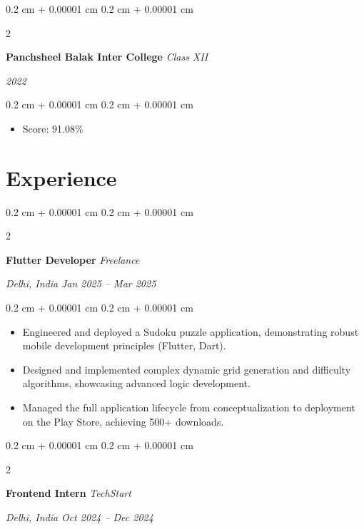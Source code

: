 \documentclass[10pt, a4paper]{article}
\newenvironment{highlights}{
    \begin{itemize}[
        topsep=0.10 cm,
        parsep=0.10 cm,
        partopsep=0pt,
        itemsep=0pt,
        leftmargin=0.4 cm + 10pt
    ]
}{
    \end{itemize}
} %
\newenvironment{onecolentry}{
    \begin{adjustwidth}{
        0.2 cm + 0.00001 cm
    }{
        0.2 cm + 0.00001 cm
    }
}{
    \end{adjustwidth}
} %
\newenvironment{twocolentry}[2][]{
    \onecolentry
    \def\secondColumn{#2}
    \setcolumnwidth{\fill, 4.5 cm}
    \begin{paracol}{2}
}{
    \switchcolumn \raggedleft \secondColumn
    \end{paracol}
    \endonecolentry
} %
\begin{document}
    \begin{twocolentry}{
        \textit{2022}
    }
    \textbf{Panchsheel Balak Inter College}
    \textit{Class XII}
    \end{twocolentry}
    \vspace{0.10 cm}
    \begin{onecolentry}
    \begin{highlights}
        \item Score: 91.08\%
    \end{highlights}
    \end{onecolentry}
    

    \section{Experience}

        \begin{twocolentry}{
            \textit{Delhi, India}    
            \textit{Jan 2025 -- Mar 2025}
        }
        \textbf{Flutter Developer}
        \textit{Freelance}
        \end{twocolentry}

        \vspace{0.10 cm}
        \begin{onecolentry}
        \begin{highlights}
            \item Engineered and deployed a Sudoku puzzle application, demonstrating robust mobile development principles (Flutter, Dart).
\item Designed and implemented complex dynamic grid generation and difficulty algorithms, showcasing advanced logic development.
\item Managed the full application lifecycle from conceptualization to deployment on the Play Store, achieving 500+ downloads.
        \end{highlights}
        \end{onecolentry}
        \vspace{0.2 cm}
        

        \begin{twocolentry}{
            \textit{Delhi, India}    
            \textit{Oct 2024 -- Dec 2024}
        }
        \textbf{Frontend Intern}
        \textit{TechStart}
        \end{twocolentry}
\end{document}
